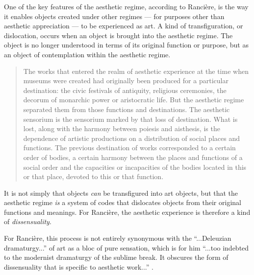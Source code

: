     One of the key features of the aesthetic regime, according to Rancière, is the way it enables objects created under other regimes — for purposes other than aesthetic appreciation — to be experienced as art. A kind of transfiguration, or dislocation, occurs when an object is brought into the aesthetic regime. The object is no longer understood in terms of its original function or purpose, but as an object of contemplation within the aesthetic regime.

    \begin{quote}
        The works that entered the realm of aesthetic experience at the time when museums were created had originally been produced for a particular destination: the civic festivals of antiquity, religious ceremonies, the decorum of monarchic power or aristocratic life. But the aesthetic regime separated them from those functions and destinations. The aesthetic sensorium is the sensorium marked by that loss of destination. What is lost, along with the harmony between poiesis and aisthesis, is the dependence of artistic productions on a distribution of social places and functions. The previous destination of works corresponded to a certain order of bodies, a certain harmony between the places and functions of a social order and the capacities or incapacities of the bodies located in this or that place, devoted to this or that function. \citep[p.56]{RancierThEmncptdSpcttr2009}
    \end{quote}

    It is not simply that objects \emph{can} be transfigured into art objects, but that the aesthetic regime \emph{is} a system of codes that dislocates objects from their original functions and meanings. For Rancière, the aesthetic experience is therefore a kind of \emph{dissensuality}.
    
    For Rancière, this process is not entirely synonymous with the “...Deleuzian dramaturgy...” of art as a bloc of pure sensation, which is for him “...too indebted to the modernist dramaturgy of the sublime break. It obscures the form of dissensuality that is specific to aesthetic work...” \citep[p.54]{RancierThEmncptdSpcttr2009}.
        
